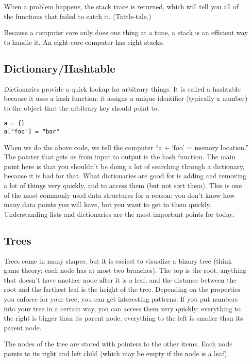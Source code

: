 \documentclass[12pt,letter]{article}
\begin{document}
When a problem happens, the stack trace is returned, which will tell
you all of the functions that failed to catch it. (Tattle-tale.)

Because a computer core only does one thing at a time, a stack is an
efficient way to handle it. An eight-core computer has eight
stacks. 

\subsection{Dictionary/Hashtable}

Dictionaries provide a quick lookup for arbitrary things. It is called
a hashtable because it uses a hash function: it assigns a unique
identifier (typically a number) to the object that the arbitrary key
should point to. 
\begin{verbatim}
a = {}
a["foo"] = "bar"
\end{verbatim}

When we do the above code, we tell the computer ``a + `foo' = memory
location.'' The pointer that gets us from input to output is the hash
function. The main point here is that you shouldn't be doing a lot of
searching through a dictionary, because it is bad for that. What
dictionaries are good for is adding and removing a lot of things very
quickly, and to access them (but not sort them). This is one of the
most commonly used data structures for a reason: you don't know how
many data points you will have, but you want to get to them
quickly. Understanding lists and dictionaries are the most important
points for today. 

\subsection{Trees}

Trees come in many shapes, but it is easiest to visualize a binary
tree (think game theory; each node has at most two branches). The top is the root, anything that doesn't
have another node after it is a leaf, and the distance between the
root and the farthest leaf is the height of the tree. Depending on the
properties you enforce for your tree, you can get interesting
patterns. If you put numbers into your tree in a certain way, you can
access them very quickly: everything to the right is bigger than its
parent node, everything to the left is smaller than its parent node. 

The nodes of the tree are stored with pointers to the other
items. Each node points to its right and left child (which may be
empty if the node is a leaf). 
\end{document}

